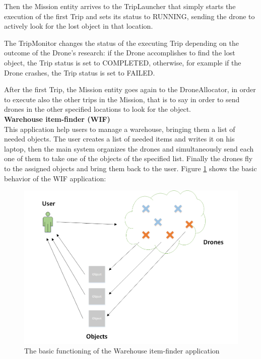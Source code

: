 Then the Mission entity arrives to the TripLauncher that simply starts the execution of the first Trip and sets its status to RUNNING, sending the drone to actively look for the lost object in that location.

The TripMonitor changes the status of the executing Trip depending on the outcome of the Drone's research:
if the Drone accomplishes to find the lost object, the Trip status is set to COMPLETED, otherwise, for example if the Drone crashes, the Trip status is set to FAILED.

After the first Trip, the Mission entity goes again to the DroneAllocator, in order to execute also the other trips in the Mission, that is to say in order to send drones in the other specified locations to look for the object.
\\

\textbf{Warehouse item-finder (WIF)}
\\

This application help users to manage a warehouse, bringing them a list of needed objects.
The user creates a list of needed items and writes it on his laptop, then
the main system organizes the drones and simultaneously send each one of them to take one of the objects of the specified list.
Finally the drones fly to the assigned objects and bring them back to the user.
Figure \ref{fig:WIS} shows the basic behavior of the WIF application:

\begin{figure}[H]
  \centering
  \includegraphics[width=\linewidth]{pictures/WIF.png}
  \caption{The basic functioning of the Warehouse item-finder application}
  \label{fig:WIS}
\end{figure}

